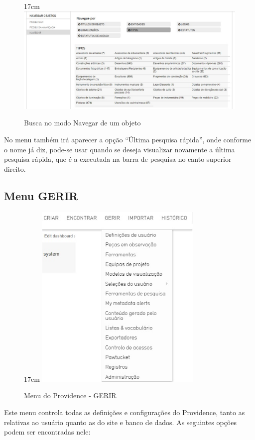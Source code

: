 \documentclass[a4paper,12pt,oneside,onecolumn,final,fleqn]{repUERJ}
\begin{document}
\begin{figure}[!ht]{17cm}
	\includegraphics[width=15cm, center]{figuras/navegar_obj.jpg}
	\caption{Busca no modo Navegar de um objeto} \label{fig:navegar_obj}
\end{figure}

No menu também irá aparecer a opção ``Última pesquisa rápida'', onde conforme o nome já diz, pode-se usar quando se deseja visualizar novamente a última pesquisa rápida, que é a executada na barra de pesquisa no canto superior direito.

\subsection{Menu GERIR}

\begin{figure}[!ht]{17cm}
	\includegraphics[width=8cm, center]{figuras/menu_gerir.jpg}
	\caption{Menu do Providence - GERIR} \label{fig:menu_gerir}
\end{figure}

Este menu controla todas as definições e configurações do Providence, tanto as relativas ao usuário quanto as do site e banco de dados. As seguintes opções podem ser encontradas  nele:
\end{document}
